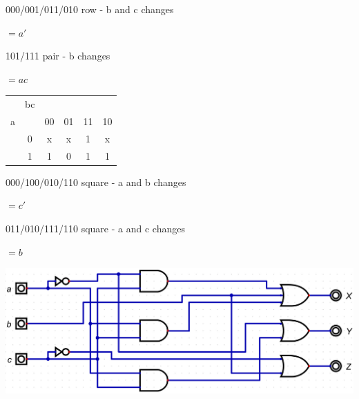 \documentclass{article}
\begin{document}
    000/001/011/010 row - b and c changes

    \quad\quad $=a'$

    101/111 pair - b changes

    \quad\quad $=ac$


    \begin{center}
        \begin{tabular} {cc|cccc}
            & bc & &&& \\
            a && 00 & 01 & 11 & 10 \\
            \hline
            & 0 & x & x & 1 & x \\
            & 1 & 1 & 0 & 1 & 1 \\
        \end{tabular}
    \end{center}

    000/100/010/110 square - a and b changes

    \quad\quad $=c'$

    011/010/111/110 square - a and c changes

    \quad\quad $=b$


    \begin{center}
        \includegraphics[width=\linewidth]{HW3_q9.1.jpg}
    \end{center}
\end{document}
